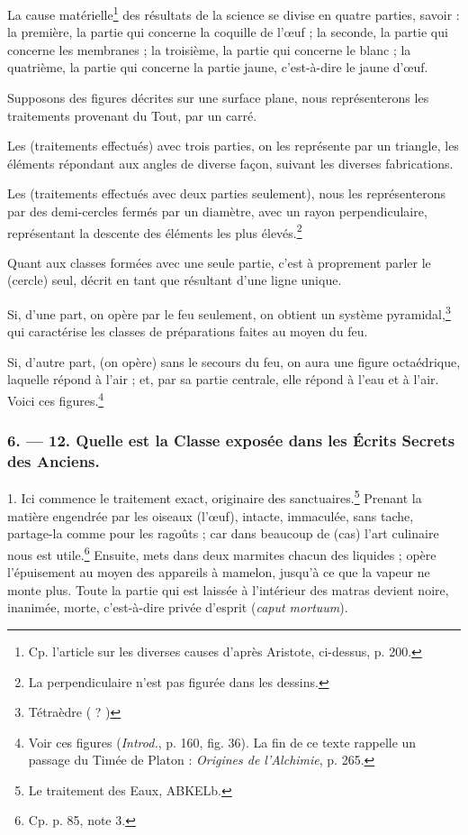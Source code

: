 \documentclass[a4paper, 11pt, oneside, polutonikogreek, french]{article}
\begin{document}
La cause matérielle\footnote{Cp. l'article sur les diverses causes d'après Aristote, ci-dessus, p. 200.} des résultats de la science se divise en quatre parties, savoir : la première, la partie qui concerne la coquille de l'œuf ; la seconde, la partie qui concerne les membranes ; la troisième, la partie qui concerne le blanc ; la quatrième, la partie qui concerne la partie jaune, c'est-à-dire le jaune d'œuf.

Supposons des figures décrites sur une surface plane, nous représenterons les traitements provenant du Tout, par un carré.

Les (traitements effectués) avec trois parties, on les représente par un triangle, les éléments répondant aux angles de diverse façon, suivant les diverses fabrications.

Les (traitements effectués avec deux parties seulement), nous les représenterons par des demi-cercles fermés par un diamètre, avec un rayon perpendiculaire, représentant la descente des éléments les plus élevés.\footnote{La perpendiculaire n'est pas figurée dans les dessins.}

Quant aux classes formées avec une seule partie, c'est à proprement parler le (cercle) seul, décrit en tant que résultant d'une ligne unique.

Si, d'une part, on opère par le feu seulement, on obtient un système pyramidal,\footnote{Tétraèdre ( ? )} qui caractérise les classes de préparations faites au moyen du feu.

Si, d'autre part, (on opère) sans le secours du feu, on aura une figure octaédrique, laquelle répond à l'air ; et, par sa partie centrale, elle répond à l'eau et à l'air. Voici ces figures.\footnote{Voir ces figures (\emph{Introd.}, p. 160, fig. 36). La fin de ce texte rappelle un passage du Timée de Platon : \emph{Origines de l'Alchimie}, p. 265.}

\bigskip
\centerline{\EightStarTaper}
\centerline{\EightStarTaper\EightStarTaper}
\bigskip

\subsubsection{6. --- 12. Quelle est la Classe exposée dans les Écrits Secrets des Anciens.}

1. Ici commence le traitement exact, originaire des sanctuaires.\footnote{Le traitement des Eaux, ABKELb.} Prenant la matière engendrée par les oiseaux (l'œuf), intacte, immaculée, sans tache, partage-la comme pour les ragoûts ; car dans beaucoup de (cas) l'art culinaire nous est utile.\footnote{Cp. p. 85, note 3.} Ensuite, mets dans deux marmites chacun des liquides ; opère l'épuisement au moyen des appareils à mamelon, jusqu'à ce que la vapeur ne monte plus. Toute la partie qui est laissée à l'intérieur des matras devient noire, inanimée, morte, c'est-à-dire privée d'esprit (\emph{caput mortuum}).
\end{document}

